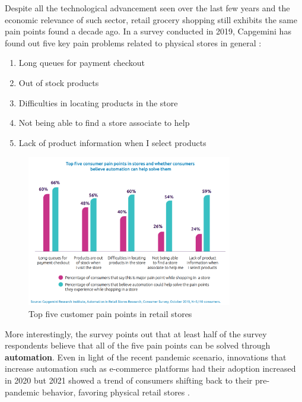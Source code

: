 \documentclass[openright]{normas-utf-tex} %
\begin{document}
Despite all the technological advancement seen over the last few years and the
economic relevance of such sector, retail grocery shopping still exhibits the
same pain points found a decade ago. In a survey conducted in 2019, Capgemini
has found out five key pain problems related to physical stores in general
\cite{Capgemini2020}:

\begin{enumerate}
        \item Long queues for payment checkout
        \item Out of stock products
        \item Difficulties in locating products in the store
        \item Not being able to find a store associate to help
        \item Lack of product information when I select products
\end{enumerate}

\begin{figure}[H]
	\centering
	\includegraphics[width=0.8\textwidth]{./images/painpoints.png}
    \caption[Top five customer pain points in retail stores]{Top five customer pain points in retail stores}
    \label{fig:capgemini}
\end{figure}

More interestingly, the survey points out that at least half of the survey
respondents believe that all of the five pain points can be solved through
\textbf{automation}. Even in light of the recent pandemic scenario, innovations
that increase automation such as e-commerce platforms had their adoption
increased in 2020 but 2021 showed a trend of consumers shifting
back to their pre-pandemic behavior, favoring physical retail stores
\cite{Kantar2022}.
\end{document}
